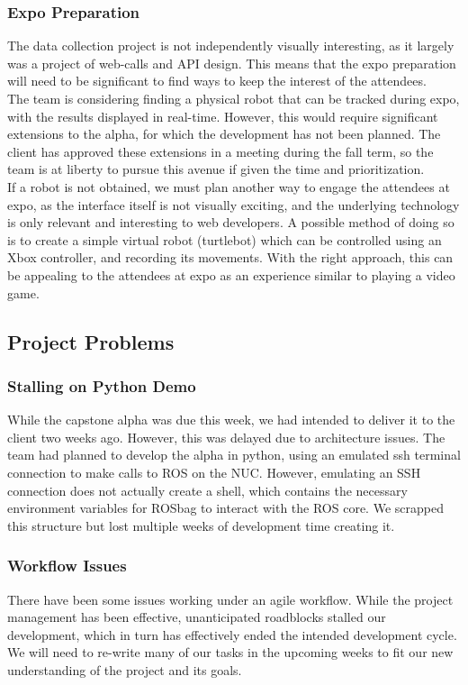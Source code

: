 \documentclass[onecolumn, draftclsnofoot,10pt, compsoc]{IEEEtran}
\begin{document}
\subsubsection{Expo Preparation}
The data collection project is not independently visually interesting, as it largely was a project of web-calls and API design. This means that the expo preparation will need to be significant to find ways to keep the interest of the attendees. \\
The team is considering finding a physical robot that can be tracked during expo, with the results displayed in real-time. However, this would require significant extensions to the alpha, for which the development has not been planned. The client has approved these extensions in a meeting during the fall term, so the team is at liberty to pursue this avenue if given the time and prioritization. \\
If a robot is not obtained, we must plan another way to engage the attendees at expo, as the interface itself is not visually exciting, and the underlying technology is only relevant and interesting to web developers. A possible method of doing so is to create a simple virtual robot (turtlebot) which can be controlled using an Xbox controller, and recording its movements. With the right approach, this can be appealing to the attendees at expo as an experience similar to playing a video game.


\subsection{Project Problems}

\subsubsection{Stalling on Python Demo}
While the capstone alpha was due this week, we had intended to deliver it to the client two weeks ago. However, this was delayed due to architecture issues. The team had planned to develop the alpha in python, using an emulated ssh terminal connection to make calls to ROS on the NUC. However, emulating an SSH connection does not actually create a shell, which contains the necessary environment variables for ROSbag to interact with the ROS core. We scrapped this structure but lost multiple weeks of development time creating it.

\subsubsection{Workflow Issues}
There have been some issues working under an agile workflow. While the project management has been effective, unanticipated roadblocks stalled our development, which in turn has effectively ended the intended development cycle. We will need to re-write many of our tasks in the upcoming weeks to fit our new understanding of the project and its goals.

%
\end{document}
